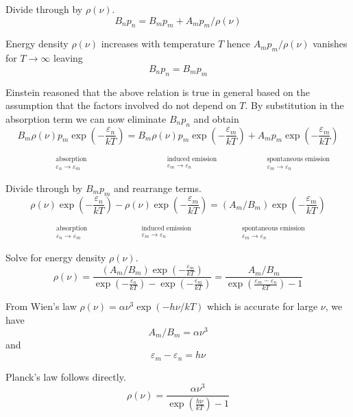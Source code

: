 \documentclass[12pt]{article}
\newcommand\BNM{B_n} %
\newcommand\BMN{B_m} %
\newcommand\AMN{A_m} %
\newcommand\ABSORPTION{\substack{\phantom{0}\\ \text{absorption}\\ \varepsilon_n\rightarrow\varepsilon_m}}
\newcommand\INDUCED{\substack{\phantom{0}\\ \text{induced emission}\\ \varepsilon_m\rightarrow\varepsilon_n}}
\newcommand\SPONTANEOUS{\substack{\phantom{0}\\ \text{spontaneous emission}\\ \varepsilon_m\rightarrow\varepsilon_n}}
\begin{document}
\noindent
Divide through by $\rho(\nu)$.
\begin{equation*}
\BNM p_n=\BMN p_m+\AMN p_m/\rho(\nu)
\end{equation*}

\noindent
Energy density $\rho(\nu)$ increases with temperature $T$
hence $\AMN p_m/\rho(\nu)$ vanishes for $T\rightarrow\infty$ leaving
\begin{equation*}
\BNM p_n=\BMN p_m
\end{equation*}

\noindent
Einstein reasoned that the above relation is true in general based on the assumption that
the factors involved do not depend on $T$.
By substitution in the absorption term we can now eliminate $B_np_n$ and obtain
\begin{equation*}
\underset{\ABSORPTION}{\BMN\rho(\nu)p_m\exp\left(-\frac{\varepsilon_n}{kT}\right)}
=\underset{\INDUCED}{\BMN\rho(\nu)p_m\exp\left(-\frac{\varepsilon_m}{kT}\right)}
+\underset{\SPONTANEOUS}{\AMN p_m\exp\left(-\frac{\varepsilon_m}{kT}\right)}
\end{equation*}

\noindent
Divide through by $\BMN p_m$ and rearrange terms.
\begin{equation*}
\underset{\ABSORPTION}{\rho(\nu)\exp\left(-\frac{\varepsilon_n}{kT}\right)}
-\underset{\INDUCED}{\rho(\nu)\exp\left(-\frac{\varepsilon_m}{kT}\right)}
=\underset{\SPONTANEOUS}{(\AMN/\BMN)\exp\left(-\frac{\varepsilon_m}{kT}\right)}
\end{equation*}

\noindent
Solve for energy density $\rho(\nu)$.
\begin{equation*}
\rho(\nu)=\frac
{\displaystyle(\AMN/\BMN)\exp\left(-\frac{\varepsilon_m}{kT}\right)}
{\displaystyle\exp\left(-\frac{\varepsilon_n}{kT}\right)-\exp\left(-\frac{\varepsilon_m}{kT}\right)}
=\frac{\AMN/\BMN}{\displaystyle\exp\left(\frac{\varepsilon_m-\varepsilon_n}{kT}\right)-1}
\end{equation*}

\noindent
From Wien's law
$\rho(\nu)=\alpha\nu^3\exp(-h\nu/kT)$ which is accurate for large $\nu$, we have
\begin{equation*}
\AMN/\BMN=\alpha\nu^3
\end{equation*}
and
\begin{equation*}
\varepsilon_m-\varepsilon_n=h\nu
\end{equation*}

\noindent
Planck's law follows directly.
\begin{equation*}
\rho(\nu)=\frac{\alpha\nu^3}{\displaystyle\exp\left(\frac{h\nu}{kT}\right)-1}
\end{equation*}
\end{document}
